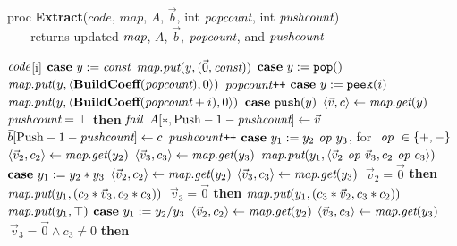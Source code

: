 \documentclass{sig-alternate}
\begin{document}
\begin{algorithm}
proc {\bf Extract}($code$, $map$, $A$, $\vec b$, int $\mbox{\it popcount}$, int $\mbox{\it pushcount}$) \\
\verb+   + returns updated $\mbox{\it map}$, $A$, ${\vec b}$, $\mbox{\it popcount}$, and $\mbox{\it pushcount}$ \\ \vspace{-12pt}
\begin{algorithmic}
 $\mbox{\it code}$[i]
\IND
\STATE $\mbox{\bf case}~y := \mbox{\it const}$
\IND
\STATE $\mbox{\it map}.\mbox{\it put}(y, (\vec 0, \mbox{\it const}))$
\UND
\STATE \vspace{-6pt}
\STATE $\mbox{\bf case}~y := \mbox{\tt pop}()$
\IND
\STATE $\mbox{\it map}.\mbox{\it put}(y, \langle{\mbox{\bf BuildCoeff}(\mbox{\it popcount})}, {0}\rangle)$
\STATE $\mbox{\it popcount}$\verb|++|
\UND
\STATE \vspace{-6pt}
\STATE $\mbox{\bf case}~y := \mbox{\tt peek}(i)$
\IND
\STATE $\mbox{\it map}.\mbox{\it put}(y, \langle{\mbox{\bf BuildCoeff}(\mbox{\it popcount}+i)}, {0}\rangle)$
\UND
\STATE \vspace{-6pt}
\STATE $\mbox{\bf case}~\mbox{\tt push}(y)$
\IND
\STATE $\langle{\vec v}, {c}\rangle \leftarrow \mbox{\it map}.\mbox{\it get}(y)$
 $\mbox{\it pushcount} = \top$ {\bf then} $\mbox{\it fail}$
\STATE $A[*, \mbox{Push} - 1 - \mbox{\it pushcount}] \leftarrow \vec v$
\STATE $\vec{b}[\mbox{Push} - 1 - \mbox{\it pushcount}] \leftarrow c$
\STATE $\mbox{\it pushcount}$\verb|++|
\UND
\STATE \vspace{-6pt}
\STATE $\mbox{\bf case}~ y_1 := y_2 \mbox{\it ~op~} y_3$, for $\mbox{\it ~op~} \in \{+, -\}$
\IND
\STATE $\langle{\vec v_2}, {c_2}\rangle \leftarrow \mbox{\it map}.\mbox{\it get}(y_2)$
\STATE $\langle{\vec v_3}, {c_3}\rangle \leftarrow \mbox{\it map}.\mbox{\it get}(y_3)$
\STATE $\mbox{\it map}.\mbox{\it put}(y_1, \langle{\vec v_2 \mbox{\it ~op~} \vec v_3}, {c_2 \mbox{\it ~op~} c_3}\rangle)$
\UND
\STATE \vspace{-6pt}
\STATE $\mbox{\bf case}~y_1 := y_2 * y_3$
\IND
\STATE $\langle{\vec v_2}, {c_2}\rangle \leftarrow \mbox{\it map}.\mbox{\it get}(y_2)$
\STATE $\langle{\vec v_3}, {c_3}\rangle \leftarrow \mbox{\it map}.\mbox{\it get}(y_3)$
 $~\vec v_2 = \vec 0$ {\bf then}
\IND
\STATE $\mbox{\it map}.\mbox{\it put}(y_1, (c_2*\vec v_3, c_2*c_3))$
\UND
{} $~\vec v_3=\vec 0$ {\bf then}
\IND
\STATE $\mbox{\it map}.\mbox{\it put}(y_1, (c_3*\vec v_2, c_3*c_2))$
\UND
{}
\IND
\STATE $\mbox{\it map}.\mbox{\it put}(y_1, \top)$
\UND
\UND
\STATE \vspace{-6pt}
\STATE $\mbox{\bf case}~y_1 := y_2 / y_3$
\IND
\STATE $\langle{\vec v_2}, {c_2}\rangle \leftarrow \mbox{\it map}.\mbox{\it get}(y_2)$
\STATE $\langle{\vec v_3}, {c_3}\rangle \leftarrow \mbox{\it map}.\mbox{\it get}(y_3)$
 $~\vec v_3 = \vec 0 \wedge c_3 \ne 0$ {\bf then}

\end{algorithmic}
\end{algorithm}
\end{document}
